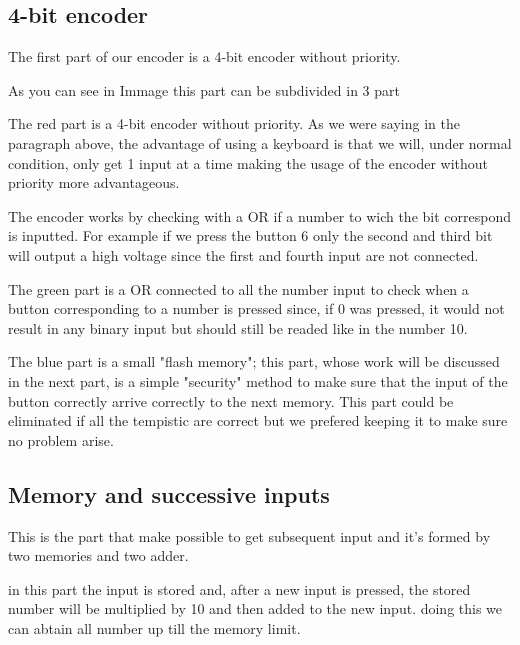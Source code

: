 \documentclass{article}
\begin{document}
\subsection{4-bit encoder}
The first part of our encoder is a 4-bit encoder without priority. 


As you can see in Immage %
this part can be subdivided in 3 part

\vspace{3mm}

The red part is a 4-bit encoder without priority. As we were saying in the paragraph above, the advantage of using a keyboard is that we will, under normal condition, %
 only get 1 input at a time making the usage of the encoder without priority more advantageous. 

The encoder works by checking with a OR if a number to wich the bit correspond is inputted. 
For example if we press the button 6 only the second and third bit will output a high voltage since the first and fourth input are not connected.

\vspace{3mm}

The green part is a OR connected to all the number input to check when a button corresponding to a number is pressed since, if 0 was pressed, it would not result in any binary input but should still be readed like in the number 10. 

\vspace{3mm}

The blue part is a small "flash memory"; this part, whose work will be discussed in the next part, is a simple "security" method to make sure that the input of the button correctly arrive correctly to the next memory. 
This part could be eliminated if all the tempistic are correct but we prefered keeping it to make sure no problem arise.



\subsection{Memory and successive inputs}

This is the part that make possible to get subsequent input and it's formed by two memories and two adder. 

in this part the input is stored and, after a new input is pressed, the stored number will be multiplied by 10 and then added to the new input. doing this we can abtain all number up till the memory limit.
\end{document}
